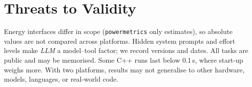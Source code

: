 \section{Threats to Validity}
\label{sec:threats}

Energy interfaces differ in scope (\texttt{powermetrics} only estimates), so absolute
values are not compared across platforms. Hidden system prompts and effort levels make
\emph{LLM} a model--tool factor; we record versions and dates.
All tasks are public and may be memorised. Some C++ runs last below 0.1\,s, where start-up
weighs more. With two platforms, results may not generalise to other
hardware, models, languages, or real-world code.
